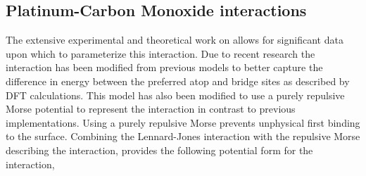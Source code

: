 



\subsection{Platinum-Carbon Monoxide interactions} The extensive experimental
\citep{Ertl:1977cg, Kelemen:1979ad, Ertl:1989, Schweizer:1989fk, Szanyi:1992aa,
Yeo:1997th} and theoretical \citep{Feibelman:2001qa, Deshlahra:2009wu,
Beurden:2002ys, Deshlahra:2012aa, Korzeniewski:1986kl, Mason:2004ix} work on
 allows for significant data upon which to parameterize this
interaction.  Due to recent research the  interaction has been
modified from previous models\citep{Michalka:2013aa, Michalka:2015aa} to better
capture the difference in energy between the preferred atop and bridge sites as
described by DFT calculations.\citep{Deshlahra:2012aa} This model has also been
modified to use a purely repulsive Morse potential to represent the
 interaction in contrast to previous
implementations.\citep{Korzeniewski:1986kl, Michalka:2013aa} Using a purely
repulsive Morse prevents unphysical  first binding to the surface.
Combining the Lennard-Jones  interaction with the repulsive
Morse describing the  interaction, provides the following
potential form for the  interaction,

